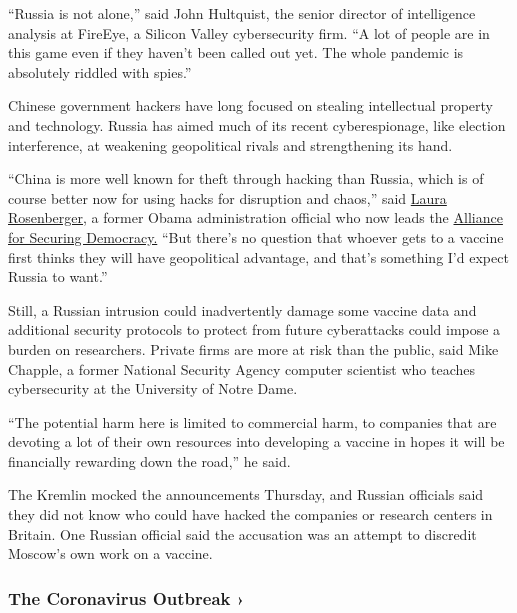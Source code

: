 ``Russia is not alone,'' said John Hultquist, the senior director of
intelligence analysis at FireEye, a Silicon Valley cybersecurity firm.
``A lot of people are in this game even if they haven't been called out
yet. The whole pandemic is absolutely riddled with spies.''

Chinese government hackers have long focused on stealing intellectual
property and technology. Russia has aimed much of its recent
cyberespionage, like election interference, at weakening geopolitical
rivals and strengthening its hand.

``China is more well known for theft through hacking than Russia, which
is of course better now for using hacks for disruption and chaos,'' said
\href{https://securingdemocracy.gmfus.org/author/laura-rosenberger/}{Laura
Rosenberger}, a former Obama administration official who now leads the
\href{https://securingdemocracy.gmfus.org/}{Alliance for Securing
Democracy.} ``But there's no question that whoever gets to a vaccine
first thinks they will have geopolitical advantage, and that's something
I'd expect Russia to want.''

Still, a Russian intrusion could inadvertently damage some vaccine data
and additional security protocols to protect from future cyberattacks
could impose a burden on researchers. Private firms are more at risk
than the public, said Mike Chapple, a former National Security Agency
computer scientist who teaches cybersecurity at the University of Notre
Dame.

``The potential harm here is limited to commercial harm, to companies
that are devoting a lot of their own resources into developing a vaccine
in hopes it will be financially rewarding down the road,'' he said.

The Kremlin mocked the announcements Thursday, and Russian officials
said they did not know who could have hacked the companies or research
centers in Britain. One Russian official said the accusation was an
attempt to discredit Moscow's own work on a vaccine.

\href{https://www.nytimes.com/news-event/coronavirus?action=click\&pgtype=Article\&state=default\&region=MAIN_CONTENT_3\&context=storylines_faq}{}

\hypertarget{the-coronavirus-outbreak-}{%
\subsubsection{The Coronavirus Outbreak
›}\label{the-coronavirus-outbreak-}}

